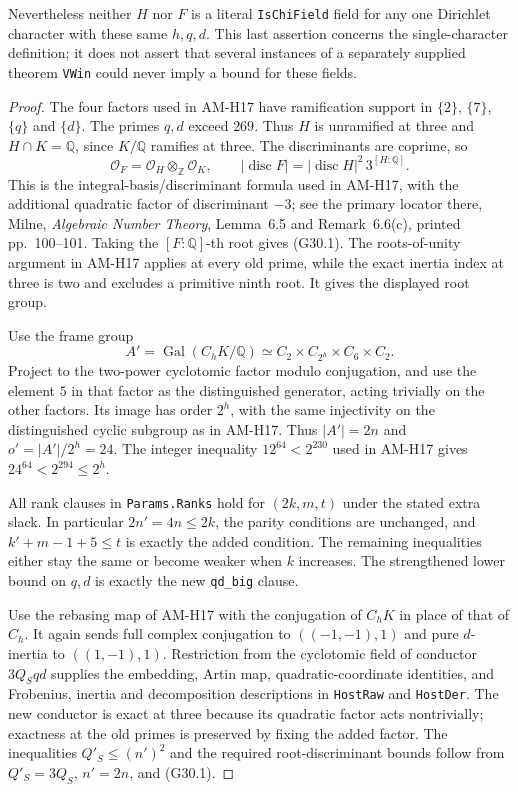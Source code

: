 \begin{proposition}
Nevertheless neither $H$ nor $F$ is a literal
\texttt{IsChiField} field for any one Dirichlet character
with these same $h,q,d$.  This last assertion concerns the
single-character definition; it does not assert that several
instances of a separately supplied theorem \texttt{VWin}
could never imply a bound for these fields.
\end{proposition}
\begin{proof}
The four factors used in AM-H17 have ramification support
in $\{2\}$, $\{7\}$, $\{q\}$ and $\{d\}$.
The primes $q,d$ exceed $269$.  Thus $H$ is unramified at
three and $H\cap K=\mathbb Q$, since $K/\mathbb Q$
ramifies at three.  The discriminants are coprime, so
\[
 \mathcal O_F=\mathcal O_H\otimes_{\mathbb Z}\mathcal O_K,
 \qquad
 |\operatorname{disc}F|
       =|\operatorname{disc}H|^2\,3^{[H:\mathbb Q]}.
\]
This is the integral-basis/discriminant formula used in
AM-H17, with the additional quadratic factor of discriminant
$-3$; see the primary locator there, Milne,
\emph{Algebraic Number Theory}, Lemma~6.5 and Remark~6.6(c),
printed pp.~100--101.  Taking the $[F:\mathbb Q]$-th root
gives (G30.1).  The roots-of-unity argument in AM-H17 applies
at every old prime, while the exact inertia index at three
is two and excludes a primitive ninth root.  It gives the
displayed root group.

Use the frame group
\[
 A'=\operatorname{Gal}(C_hK/\mathbb Q)
        \simeq C_2\times C_{2^h}\times C_6\times C_2.
\]
Project to the two-power cyclotomic factor modulo conjugation,
and use the element $5$ in that factor as the distinguished
generator, acting trivially on the other factors.  Its image
has order $2^h$, with the same injectivity on the distinguished
cyclic subgroup as in AM-H17.  Thus $|A'|=2n$ and
$o'=|A'|/2^h=24$.  The integer inequality
$12^{64}<2^{230}$ used in AM-H17 gives
$24^{64}<2^{294}\leq2^h$.

All rank clauses in \texttt{Params.Ranks} hold for
$(2k,m,t)$ under the stated extra slack.  In particular
$2n'=4n\leq2k$, the parity conditions are unchanged,
and $k'+m-1+5\leq t$ is exactly the added condition.
The remaining inequalities either stay the same or become
weaker when $k$ increases.  The strengthened lower bound
on $q,d$ is exactly the new \texttt{qd\_big} clause.

Use the rebasing map of AM-H17 with the conjugation of
$C_hK$ in place of that of $C_h$.  It again sends full
complex conjugation to $((-1,-1),1)$ and pure $d$-inertia
to $((1,-1),1)$.  Restriction from the cyclotomic field of
conductor $3Q_Sqd$ supplies the embedding, Artin map,
quadratic-coordinate identities, and Frobenius, inertia
and decomposition descriptions in \texttt{HostRaw} and
\texttt{HostDer}.  The new conductor is exact at three
because its quadratic factor acts nontrivially; exactness
at the old primes is preserved by fixing the added factor.
The inequalities $Q'_S\leq(n')^2$ and the required
root-discriminant bounds follow from
$Q'_S=3Q_S$, $n'=2n$, and (G30.1).


\end{proof}
